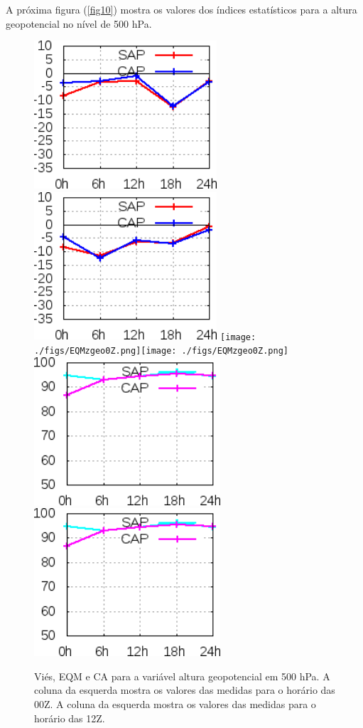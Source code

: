 A próxima figura (\autoref{fig10}) mostra os valores dos índices estatísticos para a altura geopotencial no nível de 500 hPa.

\begin{figure}[!hbp]
\includegraphics[height=5.5cm]{./figs/VIES500zgeo0Z.png}\includegraphics[height=5.5cm]{./figs/VIES500zgeo12Z.png}
\texttt{[image: ./figs/EQMzgeo0Z.png]}\texttt{[image: ./figs/EQMzgeo0Z.png]}
\includegraphics[height=5.5cm]{./figs/CA500zgeo0Z.png}\includegraphics[height=5.5cm]{./figs/CA500zgeo0Z.png}
\caption{Viés, EQM e CA para a variável altura geopotencial em 500 hPa. A coluna da esquerda mostra os valores das medidas para o horário das 00Z. A coluna da esquerda mostra os valores das medidas para o horário das 12Z.}
\label{fig10}
\end{figure}

